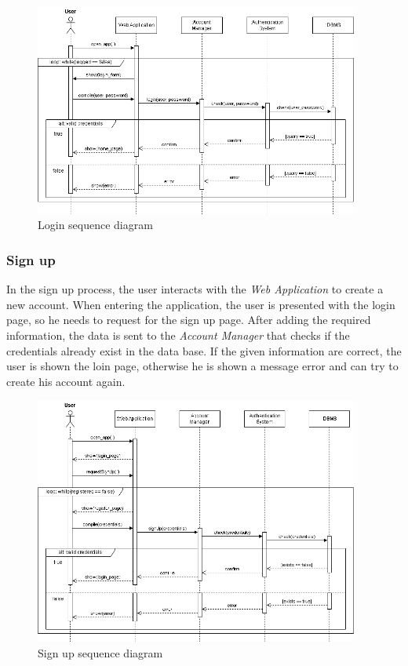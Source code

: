 \documentclass[11pt,twoside]{article}
\begin{document}
\begin{figure}[H]
\centering
\includegraphics[width=0.95\textwidth]{Images/Seq1}
\caption{Login sequence diagram}\label{Seq1}
\end{figure}

\newpage

		\subsubsection{Sign up}
In the sign up process, the user interacts with the \textit{Web Application} to create a new account. When entering the application, the user is presented with the login page, so he needs to request for the sign up page. After adding the required information, the data is sent to the \textit{Account Manager} that checks if the credentials already exist in the data base. If the given information are correct, the user is shown the loin page, otherwise he is shown a message error and can try to create his account again.	
		
\begin{figure}[H]
\centering
\includegraphics[width=0.95\textwidth]{Images/Seq2}
\caption{Sign up sequence diagram}\label{Seq2}
\end{figure}
\end{document}

